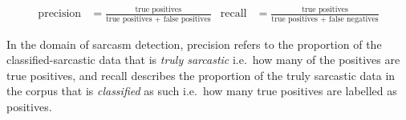\documentclass[12pt,a4paper]{article}
\begin{document}
\begin{align*}
\mbox{precision} &= \frac{\mbox{true positives}}{\mbox{true positives + false positives}}   &  \mbox{recall} &= \frac{\mbox{true positives}}{\mbox{true positives + false negatives}}
\end{align*}

\noindent In the domain of sarcasm detection, precision refers to the proportion of the classified-sarcastic data that is \textit{truly sarcastic} i.e.\ how many of the positives are true positives, and recall describes the proportion of the truly sarcastic data in the corpus that is \textit{classified} as such i.e.\ how many true positives are labelled as positives. \\


\hrulefill


\end{document}

